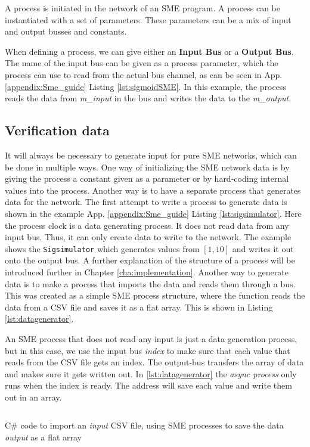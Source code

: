 A process is initiated in the network of an SME program. A process can be instantiated with a set of parameters. These parameters can
be a mix of input and output busses and constants.

When defining a process, we can give either an \textbf{Input Bus} or a \textbf{Output Bus}.
The name of the input bus can be given as a process parameter, which the process can use to read from the actual bus channel, as can be seen in App. \ref{appendix:Sme_guide} Listing \ref{lst:sigmoidSME}. In this example, the process reads the data from \emph{m\_input} in the bus and writes the data to the \emph{m\_output}.




\subsection{Verification data}
It will always be necessary to generate input for pure SME networks, which can be done in multiple ways. One way of initializing the SME network data is by giving the process a constant given as a parameter or by hard-coding internal values into the process. Another way is to have a separate process that generates data for the network. The first attempt to write a process to generate data is shown in the example App. \ref{appendix:Sme_guide} Listing \ref{lst:sigsimulator}.
Here the process clock is a data generating process. It does not read data from any input bus. Thus, it can only create data to write to the network. The example shows the \texttt{Sigsimulator} which generates values from $[1,10]$ and writes it out onto the output bus. A further explanation of the structure of a process will be introduced further in Chapter \ref{cha:implementation}.
Another way to generate data is to make a process that imports the data and reads them through a bus. This was created as a simple SME process structure, where the function reads the data from a CSV file and saves it as a flat array. This is shown in Listing \ref{lst:datagenerator}.

An SME process that does not read any input is just a data generation process, but in this case, we use the input bus \emph{index} to make sure that each value that reads from the CSV file gets an index.
The output-bus transfers the array of data and makes sure it gets written out.
In \ref{lst:datagenerator} the \emph{async process} only runs when the index is ready.  The address will save each value and write them out in an array.


\begin{listing}
  \inputminted{csharp}{codesnippets/datagenerator.cs}
  \caption{C\# code to import an \emph{input} CSV file, using SME processes to save the data \emph{output} as a flat array}
  \label{lst:datagenerator}
\end{listing}

